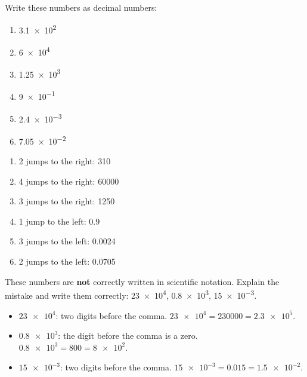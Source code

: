 \begin{exercise}
    Write these numbers as decimal numbers:
    \begin{enumerate}[label=\letraminuscula]
        \item \num{3.1e2}
        \item \num{6e4}
        \item \num{1.25e3}
        \item \num{9e-1}
        \item \num{2.4e-3}
        \item \num{7.05e-2}
    \end{enumerate}
    \begin{solu}
        \begin{enumerate}[label=\alph*)]
            \item 2 jumps to the right: \num{310}
            \item 4 jumps to the right: \num{60000}
            \item 3 jumps to the right: \num{1250}
            \item 1 jump to the left: \num{0.9}
            \item 3 jumps to the left: \num{0.0024}
            \item 2 jumps to the left: \num{0.0705}
        \end{enumerate}
    \end{solu}
\end{exercise}

\begin{exercise}
    These numbers are \textbf{not} correctly written in scientific notation. Explain the mistake and write them correctly: \num{23e4}, \num{0.8e3}, \num{15e-3}.
    \begin{solu}
        \begin{itemize}
            \item \(\num{23e4}\): two digits before the comma. \(\num{23e4} = \num{230000} = \num{2.3e5}\).
            \item \(\num{0.8e3}\): the digit before the comma is a zero. \(\num{0.8e3} = \num{800} = \num{8e2}\).
            \item \(\num{15e-3}\): two digits before the comma. \(\num{15e-3} = \num{0.015} = \num{1.5e-2}\).
        \end{itemize}
    \end{solu}
\end{exercise}


